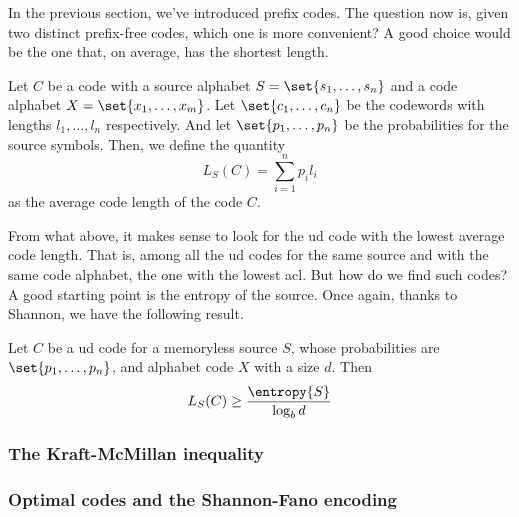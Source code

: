 \documentclass{subfiles}
\begin{document}
    In the previous section, we've introduced prefix codes. 
    The question now is, given two distinct prefix-free codes,
        which one is more convenient?
        A good choice would be the one that, on average,
        has the shortest length.

    \begin{definition*}
        Let \(C\) be a code with a source alphabet \(S = \set{s_{1}, \ldots, s_{n}}\)
        and a code alphabet \(X = \set{x_{1}, \ldots, x_{m}}\). 
        Let \(\set{c_{1}, \ldots, c_{n}}\) be the codewords with lengths 
        \(l_{1}, \ldots, l_{n}\) respectively. And let \(\set{p_{1}, \ldots, p_{n}}\)
        be the probabilities for the source symbols. 
            Then, we define the quantity
            \[
                L_{S}(C) = \sum_{i = 1}^{n}{p_{i} l_{i}}
            \]
            as the average code length of the code \(C\).
    \end{definition*}
    From what above, it makes sense to look for the \gls{ud} code with the lowest average code length.
    That is, among all the \gls{ud} codes for the same source and with the same code alphabet,
    the one with the lowest \gls{acl}. But how do we find such codes?
    A good starting point is the entropy of the source. Once again, 
    thanks to Shannon, we have the following result.
    \begin{theorem*}[Shannon]
        Let \(C\) be a \gls{ud} code for a memoryless source \(S\),
        whose probabilities are \(\set{p_{1}, \ldots, p_{n}}\),
        and alphabet code \(X\) with a size \(d\). 
        Then 
        \[
            L_{S}(C) \ge \frac{\entropy{S}}{\log_{b}{d}}
        \]
    \end{theorem*}

    \subsubsection{The Kraft-McMillan inequality}
    

    \subsubsection{Optimal codes and the Shannon-Fano encoding}
    
\end{document}
